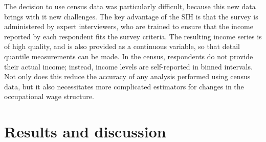 \message{ !name(paper.tex)}\documentclass[a4paper,11pt]{report}
\numberwithin{equation}{chapter}
\begin{document}
The decision to use census data was particularly difficult, because this new data brings with it new challenges. The key advantage of the SIH is that the survey is administered by expert interviewers, who are trained to ensure that the income reported by each respondent fits the survey criteria. The resulting income series is of high quality, and is also provided as a continuous variable, so that detail quantile measurements can be made. In the census, respondents do not provide their actual income; instead, income levels are self-reported in binned intervals. Not only does this reduce the accuracy of any analysis performed using census data, but it also necessitates more complicated estimators for changes in the occupational wage structure.


\section{Results and discussion}


\end{document}

